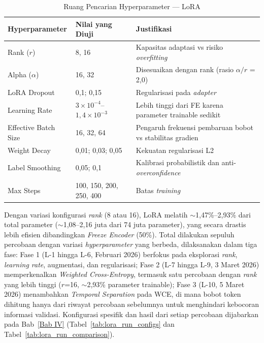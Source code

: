 \begin{table}[H]
\centering
\renewcommand{\arraystretch}{1.5}
\caption{Ruang Pencarian Hyperparameter --- LoRA}
\label{tab:lora_search_space}
\begin{tabularx}{\textwidth}{|l|l|X|}
\hline
\textbf{Hyperparameter} & \textbf{Nilai yang Diuji} & \textbf{Justifikasi} \\
\hline
Rank ($r$) & 8, 16 & Kapasitas adaptasi vs risiko \textit{overfitting} \\
\hline
Alpha ($\alpha$) & 16, 32 & Disesuaikan dengan rank (rasio $\alpha/r$ = 2,0) \\
\hline
LoRA Dropout & 0,1; 0,15 & Regularisasi pada \textit{adapter} \\
\hline
Learning Rate & $3 \times 10^{-4}$--$1{,}4 \times 10^{-3}$ & Lebih tinggi dari FE karena parameter trainable sedikit \\
\hline
Effective Batch Size & 16, 32, 64 & Pengaruh frekuensi pembaruan bobot vs stabilitas gradien \\
\hline
Weight Decay & 0,01; 0,03; 0,05 & Kekuatan regularisasi L2 \\
\hline
Label Smoothing & 0,05; 0,1 & Kalibrasi probabilistik dan anti-\textit{overconfidence} \\
\hline
Max Steps & 100, 150, 200, 250, 400 & Batas \textit{training} \\
\hline
\end{tabularx}
\end{table}

Dengan variasi konfigurasi \textit{rank} (8 atau 16), LoRA melatih $\sim$1,47\%--2,93\% dari total parameter ($\sim$1,08--2,16 juta dari 74 juta parameter), yang secara drastis lebih efisien dibandingkan \textit{Freeze Encoder} (50\%). Total dilakukan sepuluh percobaan dengan variasi \textit{hyperparameter} yang berbeda, dilaksanakan dalam tiga fase: Fase 1 (L-1 hingga L-6, Februari 2026) berfokus pada eksplorasi \textit{rank}, \textit{learning rate}, augmentasi, dan regularisasi; Fase 2 (L-7 hingga L-9, 3 Maret 2026) memperkenalkan \textit{Weighted Cross-Entropy}, termasuk satu percobaan dengan \textit{rank} yang lebih tinggi ($r$=16, $\sim$2,93\% parameter trainable); Fase 3 (L-10, 5 Maret 2026) menambahkan \textit{Temporal Separation} pada WCE, di mana bobot token dihitung hanya dari riwayat percobaan sebelumnya untuk menghindari kebocoran informasi validasi. Konfigurasi spesifik dan hasil dari setiap percobaan dijabarkan pada Bab~\ref{Bab IV} (Tabel~\ref{tab:lora_run_configs} dan Tabel~\ref{tab:lora_run_comparison}).

